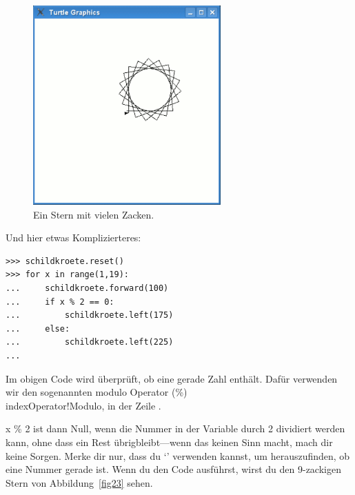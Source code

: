 \begin{figure}
\begin{center}
\includegraphics[width=72mm]{images/figure22}
\end{center}
\caption{Ein Stern mit vielen Zacken.}\label{fig22}
\end{figure}

\noindent
Und hier etwas Komplizierteres:

\begin{Verbatim}[frame=single]
>>> schildkroete.reset()
>>> for x in range(1,19):
...     schildkroete.forward(100)
...     if x % 2 == 0:
...         schildkroete.left(175)
...     else:
...         schildkroete.left(225)
...
\end{Verbatim}


Im obigen Code wird überprüft, ob  eine gerade Zahl enthält. Dafür verwenden wir den sogenannten modulo Operator (\%)\\ index{Operator!Modulo}, in der Zeile .
\par
x \% 2 ist dann Null, wenn die Nummer in der Variable  durch 2 dividiert werden kann, ohne dass ein Rest übrigbleibt---wenn das keinen Sinn macht, mach dir keine Sorgen. Merke dir nur, dass du `' verwenden kannst, um herauszufinden, ob eine Nummer gerade ist. Wenn du den Code ausführst, wirst du den 9-zackigen Stern von Abbildung~\ref{fig23} sehen.

